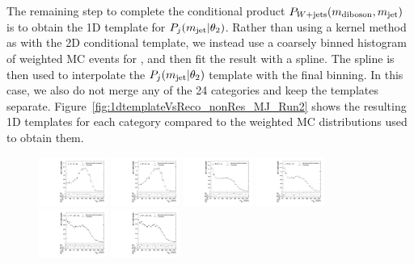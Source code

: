 The remaining step to complete the conditional product $P_{W+\text{jets}}(m_\mathrm{diboson},m_\mathrm{jet})$ is to obtain the 1D template for $P_j(m_\mathrm{jet}|\theta_2)$.
Rather than using a kernel method as with the 2D conditional template, we instead use a coarsely binned histogram of weighted MC events for \MJ, and then fit the result with a spline.
The spline is then used to interpolate the $P_j(m_\mathrm{jet}|\theta_2)$ template with the final \MJ binning.
In this case, we also do not merge any of the 24 categories and keep the templates separate.
Figure~\ref{fig:1dtemplateVsReco_nonRes_MJ_Run2} shows the resulting 1D templates for each category compared to the weighted MC distributions used to obtain them.

\begin{figure}[htbp]
  \centering
  \includegraphics[width=0.2\textwidth]{fig/analysis/templateVsReco_nonRes_r0_MJ_mu_HP_bb_LDy.pdf}
  \includegraphics[width=0.2\textwidth]{fig/analysis/templateVsReco_nonRes_r0_MJ_e_HP_bb_LDy.pdf}
  \includegraphics[width=0.2\textwidth]{fig/analysis/templateVsReco_nonRes_r0_MJ_mu_LP_bb_LDy.pdf}
  \includegraphics[width=0.2\textwidth]{fig/analysis/templateVsReco_nonRes_r0_MJ_e_LP_bb_LDy.pdf}\\
  \includegraphics[width=0.2\textwidth]{fig/analysis/templateVsReco_nonRes_r0_MJ_mu_HP_nobb_LDy.pdf}
  \includegraphics[width=0.2\textwidth]{fig/analysis/templateVsReco_nonRes_r0_MJ_e_HP_nobb_LDy.pdf}

\end{figure}
